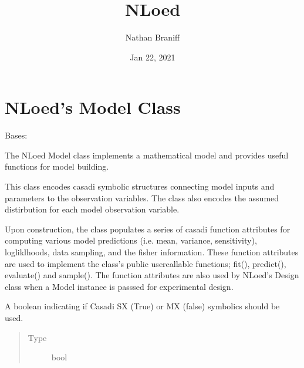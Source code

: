\documentclass[letterpaper,10pt,english,openany,oneside]{sphinxmanual}
\title{NLoed}
\date{Jan 22, 2021}
\author{Nathan Braniff}
\begin{document}
\pagestyle{empty}
\sphinxmaketitle
\pagestyle{plain}
\sphinxtableofcontents
\pagestyle{normal}
\label{\detokenize{index::doc}}



\chapter{NLoed’s Model Class}
\label{\detokenize{nloed:module-nloed.model}}\label{\detokenize{nloed:nloed-s-model-class}}\label{\detokenize{nloed::doc}}

\begin{fulllineitems}
\label{\detokenize{nloed:nloed.model.Model}}
Bases: 

The NLoed Model class implements a mathematical model and provides useful functions for model building.

This class encodes casadi symbolic structures connecting model inputs and parameters to the
observation variables. The class also encodes the assumed distirbution for each model observation
variable.

Upon construction, the class populates a series of casadi function attributes for
computing various model predictions (i.e. mean, variance, sensitivity), logliklhoods, data
sampling, and the fisher information. These function attributes are used to implement the class’s
public user\sphinxhyphen{}callable functions; fit(), predict(), evaluate() and sample(). The function attributes
are also used by NLoed’s Design class when a Model instance is passsed for experimental design.

\begin{fulllineitems}
\label{\detokenize{nloed:nloed.model.Model.symbolics_boolean}}
A boolean indicating if Casadi SX (True) or MX (false) symbolics
should be used.
\begin{quote}\begin{description}
\item[{Type}] \leavevmode
bool


\end{description}
\end{quote}
\end{fulllineitems}
\end{fulllineitems}
\end{document}
